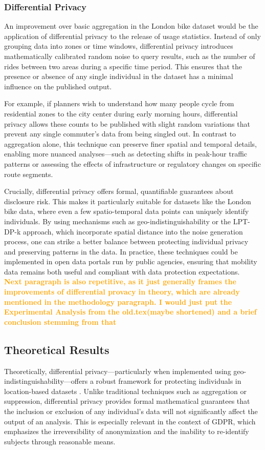 \documentclass[twocolumn]{article}
\newcommand{\later}[1]{\textbf{\textcolor{orange}{#1}}}
\begin{document}
\subsubsection{Differential Privacy}
An improvement over basic aggregation in the London bike dataset would be the application of differential privacy to the release of usage statistics. Instead of only grouping data into zones or time windows, differential privacy introduces mathematically calibrated random noise to query results, such as the number of rides between two areas during a specific time period. This ensures that the presence or absence of any single individual in the dataset has a minimal influence on the published output.

For example, if planners wish to understand how many people cycle from residential zones to the city center during early morning hours, differential privacy allows these counts to be published with slight random variations that prevent any single commuter’s data from being singled out. In contrast to aggregation alone, this technique can preserve finer spatial and temporal details, enabling more nuanced analyses—such as detecting shifts in peak-hour traffic patterns or assessing the effects of infrastructure or regulatory changes on specific route segments.

Crucially, differential privacy offers formal, quantifiable guarantees about disclosure risk. This makes it particularly suitable for datasets like the London bike data, where even a few spatio-temporal data points can uniquely identify individuals. By using mechanisms such as geo-indistinguishability or the LPT-DP-k approach, which incorporate spatial distance into the noise generation process, one can strike a better balance between protecting individual privacy and preserving patterns in the data. In practice, these techniques could be implemented in open data portals run by public agencies, ensuring that mobility data remains both useful and compliant with data protection expectations.\\
\later{Next paragraph is also repetitive, as it just generally frames the improvements of differential provacy in theory, which are already mentioned in the methodology paragraph. I would just put the Experimental Analysis from the old.tex(maybe shortened) and a brief conclusion stemming from that}\\
\subsection{Theoretical Results}
Theoretically, differential privacy—particularly when implemented using geo-indistinguishability—offers a robust framework for protecting individuals in location-based datasets \cite{andres2013geo}. Unlike traditional techniques such as aggregation or suppression, differential privacy provides formal mathematical guarantees that the inclusion or exclusion of any individual’s data will not significantly affect the output of an analysis. This is especially relevant in the context of GDPR, which emphasizes the irreversibility of anonymization and the inability to re-identify subjects through reasonable means.
\end{document}
